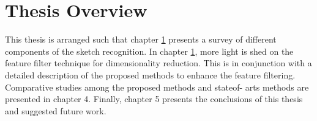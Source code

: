 \section{Thesis Overview}
This thesis is arranged such that chapter \ref{} presents a survey of different components of the
sketch recognition. In chapter \ref{}, more light is shed on the feature filter technique for dimensionality
reduction. This is in conjunction with a detailed description of the proposed methods to
enhance the feature filtering. Comparative studies among the proposed methods and stateof-
arts methods are presented in chapter 4. Finally, chapter 5 presents the conclusions of
this thesis and suggested future work.
%
%
%
%
%




